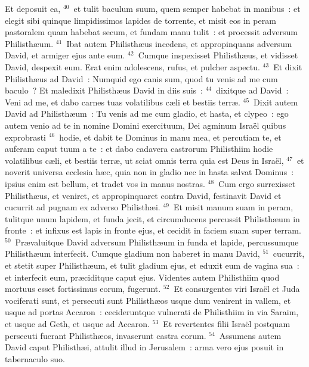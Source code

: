  Et deposuit ea,
${}^{40}$~et tulit baculum suum, quem semper habebat in manibus~: et elegit sibi quinque limpidissimos lapides de torrente, et misit eos in peram pastoralem quam habebat secum, et fundam manu tulit~: et processit adversum Philisth\ae um.
${}^{41}$~Ibat autem Philisth\ae us incedens, et appropinquans adversum David, et armiger ejus ante eum.
${}^{42}$~Cumque inspexisset Philisth\ae us, et vidisset David, despexit eum. Erat enim adolescens, rufus, et pulcher aspectu.
${}^{43}$~Et dixit Philisth\ae us ad David~: Numquid ego canis sum, quod tu venis ad me cum baculo~? Et maledixit Philisth\ae us David in diis suis~:
${}^{44}$~dixitque ad David~: Veni ad me, et dabo carnes tuas volatilibus c\ae li et bestiis terr\ae .
${}^{45}$~Dixit autem David ad Philisth\ae um~: Tu venis ad me cum gladio, et hasta, et clypeo~: ego autem venio ad te in nomine Domini exercituum, Dei agminum Isra\"el quibus exprobrasti
${}^{46}$~hodie, et dabit te Dominus in manu mea, et percutiam te, et auferam caput tuum a te~: et dabo cadavera castrorum Philisthiim hodie volatilibus c\ae li, et bestiis terr\ae , ut sciat omnis terra quia est Deus in Isra\"el,
${}^{47}$~et noverit universa ecclesia h\ae c, quia non in gladio nec in hasta salvat Dominus~: ipsius enim est bellum, et tradet vos in manus nostras.
${}^{48}$~Cum ergo surrexisset Philisth\ae us, et veniret, et appropinquaret contra David, festinavit David et cucurrit ad pugnam ex adverso Philisth\ae i.
${}^{49}$~Et misit manum suam in peram, tulitque unum lapidem, et funda jecit, et circumducens percussit Philisth\ae um in fronte~: et infixus est lapis in fronte ejus, et cecidit in faciem suam super terram.
${}^{50}$~Pr\ae valuitque David adversum Philisth\ae um in funda et lapide, percussumque Philisth\ae um interfecit. Cumque gladium non haberet in manu David,
${}^{51}$~cucurrit, et stetit super Philisth\ae um, et tulit gladium ejus, et eduxit eum de vagina sua~: et interfecit eum, pr\ae ciditque caput ejus. Videntes autem Philisthiim quod mortuus esset fortissimus eorum, fugerunt.
${}^{52}$~Et consurgentes viri Isra\"el et Juda vociferati sunt, et persecuti sunt Philisth\ae os usque dum venirent in vallem, et usque ad portas Accaron~: cecideruntque vulnerati de Philisthiim in via Saraim, et usque ad Geth, et usque ad Accaron.
${}^{53}$~Et revertentes filii Isra\"el postquam persecuti fuerant Philisth\ae os, invaserunt castra eorum.
${}^{54}$~Assumens autem David caput Philisth\ae i, attulit illud in Jerusalem~: arma vero ejus posuit in tabernaculo suo.


